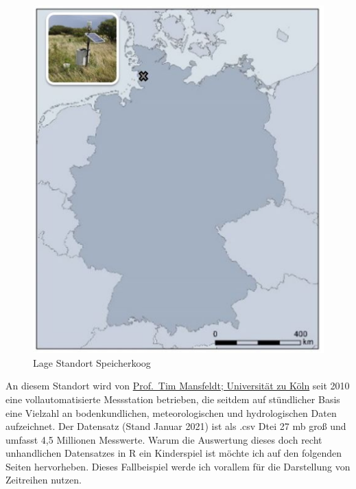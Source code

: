 \documentclass[
]{article}
\begin{document}
\begin{figure}

{\centering \includegraphics[width=1\linewidth]{images/002} 

}

\caption{Lage Standort Speicherkoog}\label{fig:unnamed-chunk-4}
\end{figure}

An diesem Standort wird von \href{https://geographie.uni-koeln.de/forschung/arbeitsgruppen/bodengeographie-bodenkunde}{Prof.~Tim Mansfeldt; Universität zu Köln} seit 2010 eine vollautomatisierte Messstation betrieben, die seitdem auf stündlicher Basis eine Vielzahl an bodenkundlichen, meteorologischen und hydrologischen Daten aufzeichnet. Der Datensatz (Stand Januar 2021) ist als .csv Dtei 27 mb groß und umfasst 4,5 Millionen Messwerte. Warum die Auswertung dieses doch recht unhandlichen Datensatzes in R ein Kinderspiel ist möchte ich auf den folgenden Seiten hervorheben. Dieses Fallbeispiel werde ich vorallem für die Darstellung von Zeitreihen nutzen.
\end{document}

